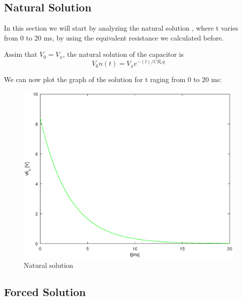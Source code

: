 \subsection{Natural Solution}

In this section we will start by analyzing the natural solution , where t varies from 0 to 20 ms, by using the equivalent resistance we calculated before.

Assim that $V_0 = V_x$, the natural solution of the capacitor is  
\begin{equation}
	V_6n(t) = V_xe^{-(t)/CR_eq}
\end{equation}

We can now plot the graph of the solution for t raging from 0 to 20 ms:

\begin{figure}[h!] \centering
\includegraphics[width=0.6\linewidth]{natural.eps}
\caption{Natural solution}
\label{fig:rc1}
\end{figure}
	
\subsection{Forced Solution}

